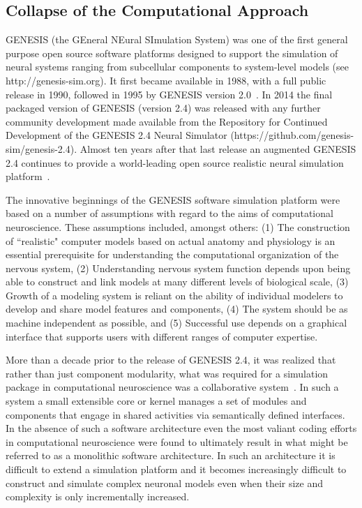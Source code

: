 \documentclass[11pt,3p,twocolumn]{JMN}
\begin{document}
\subsection{Collapse of the Computational Approach}

GENESIS (the GEneral NEural SImulation System) was one of the first general purpose open source software platforms designed to support the simulation of neural systems ranging from subcellular components to system-level models (see http://genesis-sim.org). It first became available in 1988, with a full public release in 1990, followed in 1995 by GENESIS version 2.0~\citep{jung22}. In 2014 the final packaged version of GENESIS (version 2.4) was released with any further community development made available from the Repository for Continued Development of the GENESIS 2.4 Neural Simulator (https://github.com/genesis-sim/genesis-2.4). Almost ten years after that last release an augmented GENESIS 2.4 continues to provide a world-leading open source realistic neural simulation platform~\citep[see Table\,1 in][]{tikidji-hamburyan17}.

The innovative beginnings of the GENESIS software simulation platform were based on a number of assumptions with regard to the aims of computational neuroscience. These assumptions included, amongst others: (1) The construction of ``realistic" computer models based on actual anatomy and physiology is an essential prerequisite for understanding the computational organization of the nervous system, (2) Understanding nervous system function depends upon being able to construct and link models at many different levels of biological scale, (3) Growth of a modeling system is reliant on the ability of individual modelers to develop and share model features and components, (4) The system should be as machine independent as possible, and (5) Successful use depends on a graphical interface that supports users with different ranges of computer expertise.

More than a decade prior to the release of GENESIS 2.4, it was realized that rather than just component modularity, what was required for a simulation package in computational neuroscience was a collaborative system~\citep{cornelis03}. In such a system a small extensible core or kernel manages a set of modules and components that engage in shared activities via semantically defined interfaces. In the absence of such a software architecture even the most valiant coding efforts in computational neuroscience were found to ultimately result in what might be referred to as a monolithic software architecture. In such an architecture it is difficult to extend a simulation platform and it becomes increasingly difficult to construct and simulate complex neuronal models even when their size and complexity is only incrementally increased.
\end{document}
